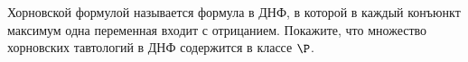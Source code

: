 Хорновской формулой называется формула в ДНФ, в которой в каждый конъюнкт максимум одна переменная входит
с отрицанием. Покажите, что множество хорновских тавтологий в ДНФ содержится в классе $\P$.
